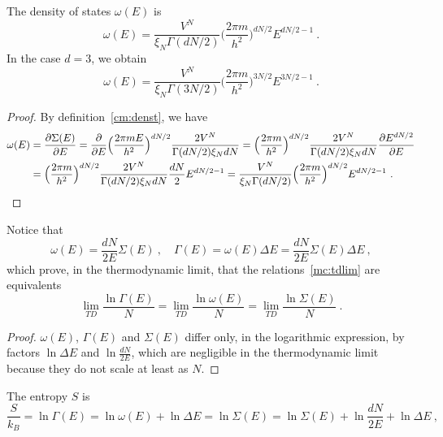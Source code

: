     The density of states $\omega(E)$ is
    \begin{equation*}
        \omega (E) = \frac{V^N}{\xi_N \Gamma(dN/2)} \Big ( \frac{2 \pi m}{h^2} \Big )^{dN/2} E^{dN/2-1} ~.
    \end{equation*}
    In the case $d = 3$, we obtain  
    \begin{equation*}
        \omega (E) = \frac{V^N}{\xi_N \Gamma(3N/2)} \Big ( \frac{2 \pi m}{h^2} \Big )^{3N/2} E^{3N/2-1} ~.
    \end{equation*}
    \begin{proof}
        By definition~\eqref{cm:denst}, we have
        \begin{equation*}
        \begin{aligned}
            \omega (E) &= \frac{\partial\Sigma (E)}{\partial E} = \frac{\partial}{\partial E} \Big (\frac{2 \pi m E}{h^2} \Big)^{dN/2} \frac{2 V^N}{\Gamma (dN/2)\xi_N d N} = \Big (\frac{2 \pi m}{h^2} \Big)^{dN/2} \frac{2 V^N}{\Gamma (dN/2)\xi_N d N} \frac{\partial E^{dN/2}}{\partial E} \\ & = \Big (\frac{2 \pi m}{h^2} \Big)^{dN/2} \frac{2 V^N}{\Gamma (dN/2)\xi_N d N} \frac{dN}{2} E^{dN/2 - 1} = \frac{V^N}{\xi_N \Gamma(dN/2)} \Big ( \frac{2 \pi m}{h^2} \Big )^{dN/2} E^{dN/2-1} ~.
        \end{aligned}
        \end{equation*}
    \end{proof}
    Notice that 
    \begin{equation*}
        \omega(E) = \frac{dN}{2E} \Sigma(E) ~, \quad \Gamma(E) = \omega(E) \Delta E = \frac{dN}{2E} \Sigma(E) \Delta E ~,
    \end{equation*}
    which prove, in the thermodynamic limit, that the relations~\eqref{mc:tdlim} are equivalents
    \begin{equation*}
        \lim_{TD} \frac{\ln \Gamma (E)}{N} = \lim_{TD} \frac{\ln \omega (E)}{N} = \lim_{TD} \frac{\ln \Sigma (E)}{N} ~.
    \end{equation*}
    \begin{proof}
        $\omega(E)$, $\Gamma(E)$ and $\Sigma(E)$ differ only, in the logarithmic expression, by factors $\ln \Delta E$ and $\ln \frac{dN}{2E}$, which are negligible in the thermodynamic limit because they do not scale at least as $N$.
    \end{proof}
    The entropy $S$ is
    \begin{equation*}
        \frac{S}{k_B} = \ln \Gamma(E) = \ln \omega(E) + \ln \Delta E = \ln \Sigma(E) = \ln \Sigma(E) + \ln \frac{dN}{2E} + \ln \Delta E ~,
    \end{equation*}
